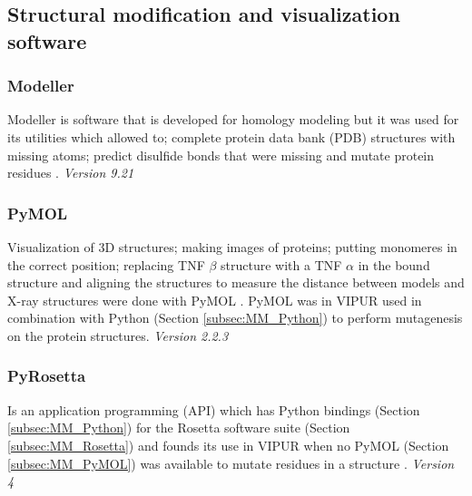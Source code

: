 \subsection{Structural modification and visualization software}

\subsubsection{Modeller}
Modeller is software that is developed for homology modeling but it was used for its utilities which allowed to; complete protein data bank (PDB) structures with missing atoms; predict disulfide bonds that were missing and mutate protein residues \cite{modeller_about_nodate,eswar_comparative_2006,sali_comparative_1993,fiser_modeling_2000}. 
\label{subsec:MM_Modeller}
\newline
\textit{Version 9.21}

\subsubsection{PyMOL}
Visualization of 3D structures; making images of proteins; putting monomeres in the correct position; replacing TNF $\beta$ structure with a TNF $\alpha$ in the bound structure and aligning the structures to measure the distance between models and X-ray structures were done with PyMOL \cite{schrodinger_pymol_nodate}. PyMOL was in VIPUR used in combination with Python (Section \ref{subsec:MM_Python}) to perform mutagenesis on the protein structures.
\label{subsec:MM_PyMOL}
\newline
\textit{Version 2.2.3}

\subsubsection{PyRosetta}
Is an application programming (API) which has Python bindings (Section \ref{subsec:MM_Python}) for the Rosetta software suite (Section \ref{subsec:MM_Rosetta}) and founds its use in VIPUR when no PyMOL (Section \ref{subsec:MM_PyMOL}) was available to mutate residues in a structure \cite{jeffrey_pyrosetta_nodate}.
\label{subsec:MM_PyRosetta}
\newline
\textit{Version 4}

